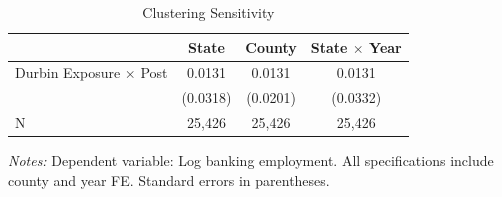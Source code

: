 \begin{table}[htbp]
\centering
\caption{Clustering Sensitivity}
\label{tab:clustering}
\begin{tabular}{lccc}
\toprule
 & State & County & State $\times$ Year \\
\midrule
Durbin Exposure $\times$ Post & 0.0131 & 0.0131 & 0.0131 \\
 & (0.0318) & (0.0201) & (0.0332) \\
N & 25,426 & 25,426 & 25,426 \\
\bottomrule
\end{tabular}
\begin{minipage}{0.9\textwidth}
\vspace{0.5em}
\footnotesize \textit{Notes:} Dependent variable: Log banking employment. All specifications include county and year FE. Standard errors in parentheses.
\end{minipage}
\end{table}

